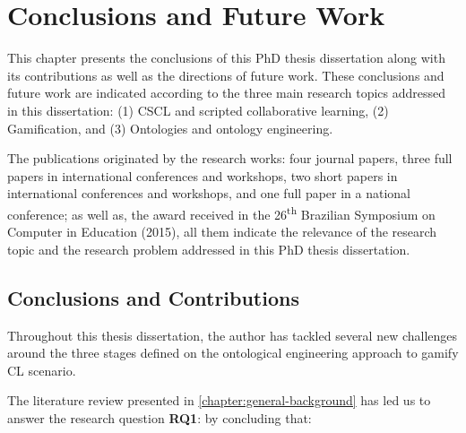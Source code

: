 \chapter{Conclusions and Future Work}
\label{chapter:conclusions} 

This chapter presents the conclusions of this PhD thesis dissertation along with its contributions as well as the directions of future work.
These conclusions and future work are indicated according to the three main research topics addressed in this dissertation:
(1) CSCL and scripted collaborative learning,
(2) Gamification, and
(3) Ontologies and ontology engineering.

The publications originated by the research works: four journal papers, three full papers in international conferences and workshops, two short papers in international conferences and workshops, and one full paper in a national conference; as well as, the award received in the 26\textsuperscript{th} Brazilian Symposium on Computer in Education (2015), all them indicate the relevance of the research topic and the research problem addressed in this PhD thesis dissertation.

\section{Conclusions and Contributions}
\label{sec:conclusions-contributions}

Throughout this thesis dissertation, the author has tackled several new challenges around the three stages defined on the ontological engineering approach to gamify CL scenario.

The literature review presented in \autoref{chapter:general-background} has led us to answer the research question \textbf{RQ1}: 
 by concluding that:

